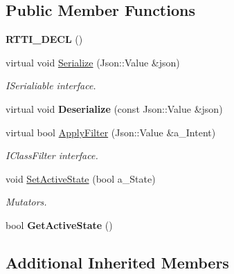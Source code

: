 \subsection*{Public Member Functions}
\begin{DoxyCompactItemize}
\item 
\mbox{\label{class_nonsense_filter_a3c43c78f63f21fea355665238ab4dbbd}} 
{\bfseries R\+T\+T\+I\+\_\+\+D\+E\+CL} ()
\item 
\mbox{\label{class_nonsense_filter_aeadc477fd746161c7fe737d3985deb5b}} 
virtual void \hyperlink{class_nonsense_filter_aeadc477fd746161c7fe737d3985deb5b}{Serialize} (Json\+::\+Value \&json)
\begin{DoxyCompactList}\small\item\em I\+Serialiable interface. \end{DoxyCompactList}\item 
\mbox{\label{class_nonsense_filter_a163277e1cd3bc9a012e7f62382c208cf}} 
virtual void {\bfseries Deserialize} (const Json\+::\+Value \&json)
\item 
\mbox{\label{class_nonsense_filter_ab419d8a1bf59c0ac9cb9b0341d2f598b}} 
virtual bool \hyperlink{class_nonsense_filter_ab419d8a1bf59c0ac9cb9b0341d2f598b}{Apply\+Filter} (Json\+::\+Value \&a\+\_\+\+Intent)
\begin{DoxyCompactList}\small\item\em I\+Class\+Filter interface. \end{DoxyCompactList}\item 
\mbox{\label{class_nonsense_filter_afc0be68a9a6cb9d01f18f761fbe0d783}} 
void \hyperlink{class_nonsense_filter_afc0be68a9a6cb9d01f18f761fbe0d783}{Set\+Active\+State} (bool a\+\_\+\+State)
\begin{DoxyCompactList}\small\item\em Mutators. \end{DoxyCompactList}\item 
\mbox{\label{class_nonsense_filter_aef2d704c70d67369bfbd1115d17a4dab}} 
bool {\bfseries Get\+Active\+State} ()
\end{DoxyCompactItemize}
\subsection*{Additional Inherited Members}



